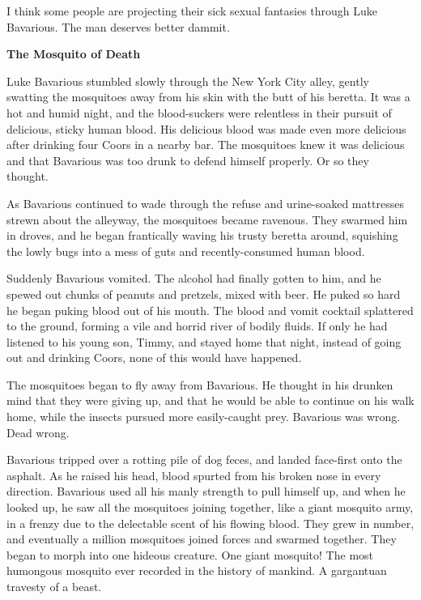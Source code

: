 I think some people are projecting their sick sexual fantasies
through Luke Bavarious. The man deserves better dammit. 

 





{\bf The Mosquito of Death}



Luke Bavarious stumbled slowly through the New York City alley,
gently swatting the mosquitoes away from his skin with the butt of
his beretta. It was a hot and humid night, and the blood-suckers
were relentless in their pursuit of delicious, sticky human blood.
His delicious blood was made even more delicious after drinking
four Coors in a nearby bar. The mosquitoes knew it was delicious
and that Bavarious was too drunk to defend himself properly. Or so
they thought.



As Bavarious continued to wade through the refuse and urine-soaked
mattresses strewn about the alleyway, the mosquitoes became
ravenous. They swarmed him in droves, and he began frantically
waving his trusty beretta around, squishing the lowly bugs into a
mess of guts and recently-consumed human blood.



Suddenly Bavarious vomited. The alcohol had finally gotten to him,
and he spewed out chunks of peanuts and pretzels, mixed with beer.
He puked so hard he began puking blood out of his mouth. The blood
and vomit cocktail splattered to the ground, forming a vile and
horrid river of bodily fluids. If only he had listened to his young
son, Timmy, and stayed home that night, instead of going out and
drinking Coors, none of this would have happened.



The mosquitoes began to fly away from Bavarious. He thought in his
drunken mind that they were giving up, and that he would be able to
continue on his walk home, while the insects pursued more
easily-caught prey. Bavarious was wrong. Dead wrong.



Bavarious tripped over a rotting pile of dog feces, and landed
face-first onto the asphalt. As he raised his head, blood spurted
from his broken nose in every direction. Bavarious used all his
manly strength to pull himself up, and when he looked up, he saw
all the mosquitoes joining together, like a giant mosquito army, in
a frenzy due to the delectable scent of his flowing blood. They
grew in number, and eventually a million mosquitoes joined forces
and swarmed together. They began to morph into one hideous
creature. One giant mosquito! The most humongous mosquito ever
recorded in the history of mankind. A gargantuan travesty of a
beast.



